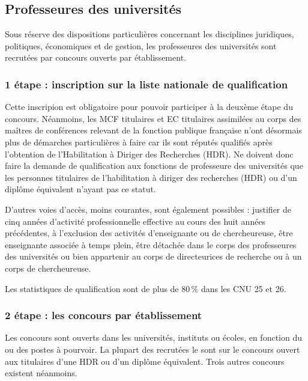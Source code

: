 \subsection{Professeur\mp e\mp s des universit\'es}

Sous r\'eserve des dispositions particuli\`eres concernant les disciplines juridiques, politiques,
\'economiques et de gestion, les professeur\mp e\mp s des universit\'es sont recrut\'e\mp e\mp s par concours ouverts par \'etablissement.

\subsubsection*{1\iere{} \'etape : inscription sur la liste nationale de qualification}

Cette inscripion est obligatoire pour pouvoir participer \`a la deux\`eme \'etape du concours. N\'eanmoins, les MCF titulaires et EC titulaires assimil\'e\mp e\mp s au corps des ma\^itres de conf\'erences relevant de la fonction publique française n'ont d\'esormais plus de d\'emarches particuli\`eres \`a faire car ils sont r\'eput\'es qualifi\'es apr\`es l'obtention de l'Habilitation \`a Diriger des Recherches (HDR). Ne doivent donc faire la demande de qualification aux fonctions de professeur\mp e des universit\'es que les personnes titulaires de l'habilitation \`a diriger des recherches (HDR) ou d'un dipl\^ome \'equivalent n'ayant pas ce statut.

D'autres voies d'acc\`es, moins courantes, sont \'egalement possibles :
justifier de cinq ann\'ees d'activit\'e professionnelle effective au cours des huit ann\'ees pr\'ec\'edentes,
\`a l'exclusion des activit\'es d'enseignant\mp e ou de chercheur\mp euse,
\^etre enseignant\mp e associ\'e\mp e \`a temps plein,
\^etre d\'etach\'e\mp e dans le corps des professeur\mp e\mp s des universit\'es
ou bien appartenir au corps de directeur\mp ice\mp s de recherche ou \`a un corps de chercheur\mp euse.

Les statistiques de qualification sont de plus de 80\,\% dans les CNU 25 et 26.

\subsubsection*{2\ieme{} \'etape : les concours par \'etablissement}

Les concours sont ouverts dans les universit\'es, instituts ou \'ecoles, en fonction du ou des postes \`a pourvoir.
La plupart des recrut\'e\mp e\mp s le sont sur le concours ouvert aux titulaires d'une HDR ou d'un dipl\^ome \'equivalent.
Trois autres concours existent n\'eanmoins.


